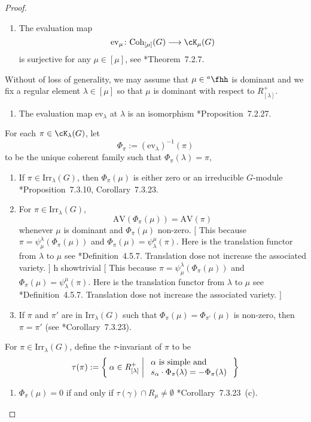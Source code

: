 \documentclass[12pt,a4paper]{amsart}
\newcommand{\trivial}[2][]{\if\relax\detokenize{#1}\relax
  {%
      \color{orange} \vspace{0em} $[$  #2 $]$
      \color{black}
  }
  \else
\ifx#1h
\ifcsname showtrivial\endcsname
{%
    \color{orange} \vspace{0em}  $[$ #2 $]$
    \color{black}
}
\fi
\else {\red Wrong argument!} \fi
\fi
}
\newcommand{\AV}{\mathrm{AV}}
\numberwithin{equation}{section}
\theoremstyle{remark}
\def\Irr{\mathrm{Irr}}
\def\hha{{}^a\fhh}
\def\ahh{\hha}
\def\Coh{\mathrm{Coh}}
\def\ev#1{{\mathrm{ev}_{#1}}}
\newcommand{\Grt}{\cK}
\begin{document}
\begin{proof}
  \begin{enumerate}[label=(\alph*)]
    \item \label{it:t1} The evaluation map
          \[
          \ev{\mu}\colon \Coh_{[\mu]}(G)\longrightarrow \Grt_{\mu}(G)
          \]
          is surjective for any $\mu \in [\mu]$, see \cite{Vg}*{Theorem~7.2.7}.
  \end{enumerate}
  Without of loss of generality, we may assume that $\mu\in \ahh$ is dominant
  and we fix a regular element $\lambda \in [\mu]$ so that $\mu$ is dominant
  with respect to $R^{+}_{[\lambda]}$.
  \begin{enumerate}[resume*]
    \item \label{it:t2} The evaluation map $\ev{\lambda}$ at $\lambda$ is an
          isomorphism \cite{Vg}*{Proposition~7.2.27}.
  \end{enumerate}
  For each $\pi\in \Grt_{\lambda}(G)$, let
  \[
    \Phi_{\pi}:= (\ev{\lambda})^{-1}(\pi)
  \]
  to be the unique coherent family such that $\Phi_{\pi}(\lambda) = \pi$,
  \begin{enumerate}[resume*]
    \item \label{it:t3} If $\pi\in \Irr_{\lambda}(G)$, then $\Phi_{\pi}(\mu)$
          is either zero or an irreducible $G$-module
          \cite{Vg}*{Proposition~7.3.10, Corollary~7.3.23}.
    \item \label{it:t4} For $\pi\in \Irr_{\lambda}(G)$,
          \[
          \AV(\Phi_{\pi}(\mu)) = \AV(\pi)
          \]
          whenever $\mu$ is dominant and $\Phi_{\pi}(\mu)$ non-zero.
          \trivial[]{ This because
          $\pi = \psi_{\mu}^{\lambda}(\Phi_{\pi}(\mu))$ and
          $\Phi_{\pi}(\mu) = \psi_{\lambda}^{\mu}(\pi)$. Here is the
          translation functor from $\lambda$ to $\mu$ see
          \cite{Vg}*{Definition~4.5.7}. Translation dose not increase the
          associated variety. }
    \item \label{it:t5} If $\pi$ and $\pi'$ are in $\Irr_{\lambda}(G)$ such that
          $\Phi_{\pi}(\mu) = \Phi_{\pi'}(\mu)$ is non-zero, then $\pi=\pi'$
          (see \cite{V4}*{Corollary~7.3.23}).
  \end{enumerate}
  For $\pi\in \Irr_{\lambda}(G)$, define the $\tau$-invariant of $\pi$ to be
  \begin{equation}\label{eq:taupi}
    \tau(\pi) := \Set{\alpha\in R^{+}_{[\lambda]}|
      \begin{array}{l}
        \text{$\alpha$ is simple and }\\
        s_{\alpha}\cdot \Phi_{\pi}(\lambda) = -\Phi_{\pi}(\lambda)
      \end{array}
    }
  \end{equation}
  \begin{enumerate}[resume*]
    \item
          \label{it:t6}
          $\Phi_{\pi}(\mu) =0$ if and only if
          $\tau(\gamma)\cap R_\mu \neq \emptyset$
          \cite{Vg}*{Corollary~7.3.23~(c)}.
  \end{enumerate}


\end{proof}
\end{document}
